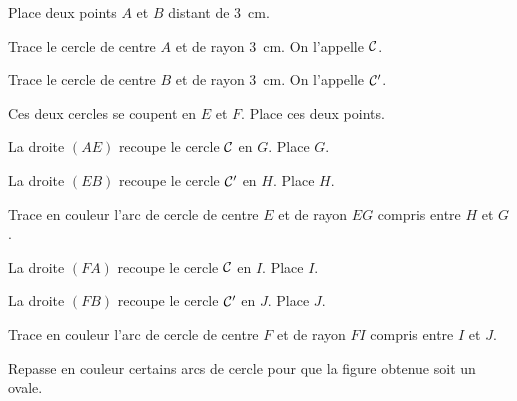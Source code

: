 \begin{myenumerate}
  \item Place deux points $A$ et $B$ distant de 3~cm.
  \item Trace le cercle de centre $A$ et de rayon 3~cm. On l'appelle $\cal C$.
  \item Trace le cercle de centre $B$ et de rayon 3~cm. On l'appelle ${\cal C}'$.
  \item Ces deux cercles se coupent en $E$ et $F$. Place ces deux points.
  \item La droite $(AE)$ recoupe le cercle $\cal C$ en $G$. Place $G$.
  \item La droite $(EB)$ recoupe le cercle ${\cal C}'$ en $H$. Place $H$.
  \item Trace en couleur l'arc de cercle de centre $E$ et de rayon $EG$ compris entre $H$ et $G$.
  \item La droite $(FA)$ recoupe le cercle $\cal C$ en $I$. Place $I$.
  \item La droite $(FB)$ recoupe le cercle ${\cal C}'$ en $J$. Place $J$.
  \item Trace en couleur l'arc de cercle de centre $F$ et de rayon $FI$ compris entre $I$ et $J$.
  \item Repasse en couleur certains arcs de cercle pour que la figure obtenue soit un ovale.
\end{myenumerate}
